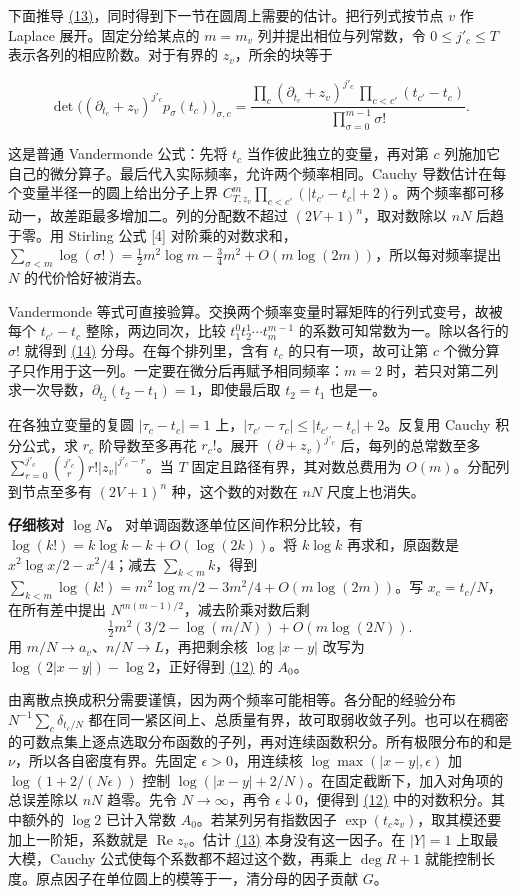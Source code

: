\documentclass[11pt,a4paper]{article}
\begin{document}
下面推导 \hyperref[eq:13]{(13)}，同时得到下一节在圆周上需要的估计。把行列式按节点 \(v\) 作 Laplace 展开。固定分给某点的 \(m=m_v\) 列并提出相位与列常数，令 \(0\le j'_c\le T\) 表示各列的相应阶数。对于有界的 \(z_v\)，所余的块等于

\[
 \det\big((\partial_{t_c}+z_v)^{j'_c}p_\sigma(t_c)\big)_{\sigma,c}
 =\frac{\prod_c(\partial_{t_c}+z_v)^{j'_c}\,
               \prod_{c<c'}(t_{c'}-t_c)}{\prod_{\sigma=0}^{m-1}\sigma!}.   \tag{14}\label{eq:14}
\]

这是普通 Vandermonde 公式：先将 \(t_c\) 当作彼此独立的变量，再对第 \(c\) 列施加它自己的微分算子。最后代入实际频率，允许两个频率相同。Cauchy 导数估计在每个变量半径一的圆上给出分子上界 \(C_{T,z_v}^{m}\prod_{c<c'}(|t_{c'}-t_c|+2)\)。两个频率都可移动一，故差距最多增加二。列的分配数不超过 \((2V+1)^n\)，取对数除以 \(nN\) 后趋于零。用 Stirling 公式 {[}4{]} 对阶乘的对数求和，\(\sum_{\sigma<m}\log(\sigma!)=\frac12m^2\log m-\frac34m^2+O(m\log(2m))\)，所以每对频率提出 \(N\) 的代价恰好被消去。

Vandermonde 等式可直接验算。交换两个频率变量时幂矩阵的行列式变号，故被每个 \(t_{c'}-t_c\) 整除，两边同次，比较 \(t_1^0t_2^1\cdots t_m^{m-1}\) 的系数可知常数为一。除以各行的 \(\sigma!\) 就得到 \hyperref[eq:14]{(14)} 分母。在每个排列里，含有 \(t_c\) 的只有一项，故可让第 \(c\) 个微分算子只作用于这一列。一定要在微分后再赋予相同频率：\(m=2\) 时，若只对第二列求一次导数，\(\partial_{t_2}(t_2-t_1)=1\)，即使最后取 \(t_2=t_1\) 也是一。

在各独立变量的复圆 \(|\tau_c-t_c|=1\) 上，\(|\tau_{c'}-\tau_c|\le|t_{c'}-t_c|+2\)。反复用 Cauchy 积分公式，求 \(r_c\) 阶导数至多再花 \(r_c!\)。展开 \((\partial+z_v)^{j'_c}\) 后，每列的总常数至多 \(\sum_{r=0}^{j'_c}\binom{j'_c}r r!|z_v|^{j'_c-r}\)。当 \(T\) 固定且路径有界，其对数总费用为 \(O(m)\)。分配列到节点至多有 \((2V+1)^n\) 种，这个数的对数在 \(nN\) 尺度上也消失。

\textbf{仔细核对 \(\log N\)。} 对单调函数逐单位区间作积分比较，有 \(\log(k!)=k\log k-k+O(\log(2k))\)。将 \(k\log k\) 再求和，原函数是 \(x^2\log x/2-x^2/4\)；减去 \(\sum_{k<m}k\)，得到 \(\sum_{k<m}\log(k!)=m^2\log m/2-3m^2/4+O(m\log(2m))\)。写 \(x_c=t_c/N\)，在所有差中提出 \(N^{m(m-1)/2}\)，减去阶乘对数后剩 \[
 \tfrac12m^2(3/2-\log(m/N))+O(m\log(2N)).
\] 用 \(m/N\to a_v\)、\(n/N\to L\)，再把剩余核 \(\log|x-y|\) 改写为 \(\log(2|x-y|)-\log2\)，正好得到 \hyperref[eq:12]{(12)} 的 \(A_0\)。

由离散点换成积分需要谨慎，因为两个频率可能相等。各分配的经验分布 \(N^{-1}\sum_c\delta_{t_c/N}\) 都在同一紧区间上、总质量有界，故可取弱收敛子列。也可以在稠密的可数点集上逐点选取分布函数的子列，再对连续函数积分。所有极限分布的和是 \(\nu\)，所以各自密度有界。先固定 \(\epsilon>0\)，用连续核 \(\log\max(|x-y|,\epsilon)\) 加 \(\log(1+2/(N\epsilon))\) 控制 \(\log(|x-y|+2/N)\)。在固定截断下，加入对角项的总误差除以 \(nN\) 趋零。先令 \(N\to\infty\)，再令 \(\epsilon\downarrow0\)，便得到 \hyperref[eq:12]{(12)} 中的对数积分。其中额外的 \(\log2\) 已计入常数 \(A_0\)。若某列另有指数因子 \(\exp(t_cz_v)\)，取其模还要加上一阶矩，系数就是 \(\operatorname{Re}z_v\)。估计 \hyperref[eq:13]{(13)} 本身没有这一因子。在 \(|Y|=1\) 上取最大模，Cauchy 公式使每个系数都不超过这个数，再乘上 \(\deg R+1\) 就能控制长度。原点因子在单位圆上的模等于一，清分母的因子贡献 \(G\)。
\end{document}
